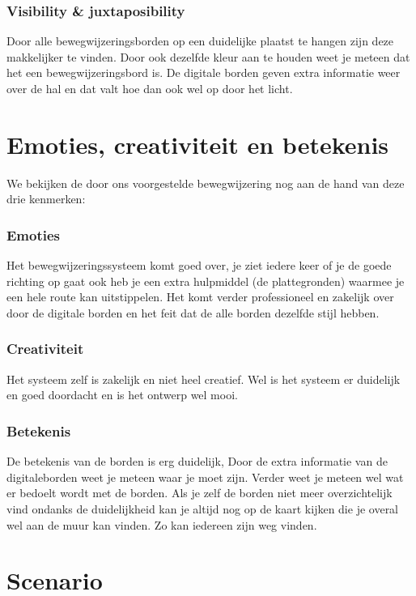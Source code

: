 \subsubsection{Visibility \& juxtaposibility}

Door alle bewegwijzeringsborden op een duidelijke plaatst te hangen zijn deze makkelijker te vinden. Door ook dezelfde kleur aan te houden weet je meteen dat het een bewegwijzeringsbord is. De digitale borden geven extra informatie weer over de hal en dat valt hoe dan ook wel op door het licht.


\section{Emoties, creativiteit en betekenis}

We bekijken de door ons voorgestelde bewegwijzering nog aan de hand van deze drie kenmerken:


\subsubsection{Emoties}

Het bewegwijzeringssysteem komt goed over, je ziet iedere keer of je de goede richting op gaat ook heb je een extra hulpmiddel (de plattegronden) waarmee je een hele route kan uitstippelen. Het komt verder professioneel en zakelijk over door de digitale borden en het feit dat de alle borden dezelfde stijl hebben.


\subsubsection{Creativiteit}

Het systeem zelf is zakelijk en niet heel creatief. Wel is het systeem er duidelijk en goed doordacht en is het ontwerp wel mooi.


\subsubsection{Betekenis}

De betekenis van de borden is erg duidelijk, Door de extra informatie van de digitaleborden weet je meteen waar je moet zijn. Verder weet je meteen wel wat er bedoelt wordt met de borden. Als je zelf de borden niet meer overzichtelijk vind ondanks de duidelijkheid kan je altijd nog op de kaart kijken die je overal wel aan de muur kan vinden. Zo kan iedereen zijn weg vinden.


\section{Scenario}


